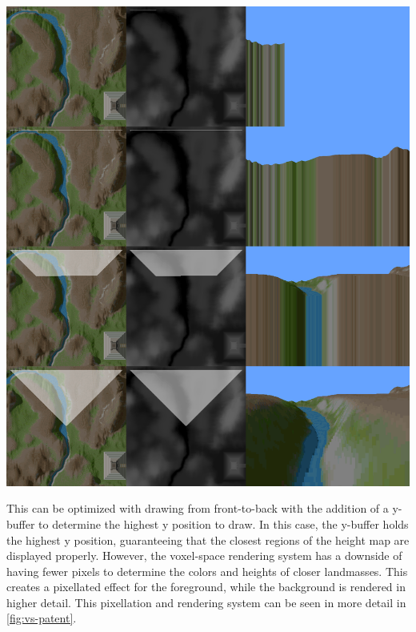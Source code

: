 \documentclass[10pt]{report}
\begin{document}
		\begin{minipage}{\textwidth}
			\centering
			\includegraphics[scale=.2]{line-by-line}
			\label{fig:vs-raster}
		\end{minipage}
	
		This can be optimized with drawing from front-to-back with the addition of a y-buffer to determine the highest y position to draw. In this case, the y-buffer holds the highest y position, guaranteeing that the closest regions of the height map are displayed properly. However, the voxel-space rendering system has a downside of having fewer pixels to determine the colors and heights of closer landmasses. This creates a pixellated effect for the foreground, while the background is rendered in higher detail. This pixellation and rendering system can be seen in more detail in \autoref{fig:vs-patent}. 
		 
\end{document}
